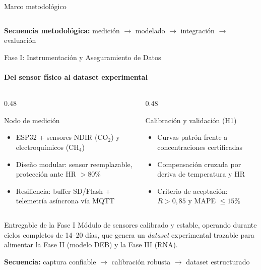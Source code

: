 \documentclass[aspectratio=169, 11pt]{beamer}
\begin{document}
\begin{frame}{Marco metodológico}
\begin{columns}[T,onlytextwidth]
\end{columns}

\vspace{0.25cm}
\centering
\footnotesize
\textbf{Secuencia metodológica:} medición $\rightarrow$ modelado $\rightarrow$ integración $\rightarrow$ evaluación
\end{frame}
\begin{frame}{Fase I: Instrumentación y Aseguramiento de Datos}
\framesubtitle{Del sensor físico al dataset experimental}

\begin{columns}[T,onlytextwidth]

\begin{column}{0.48\textwidth}

\begin{block}{Nodo de medición}
\scriptsize
\begin{itemize}
    \item ESP32 + sensores NDIR (CO$_2$) y electroquímicos (CH$_4$)
    \item Diseño modular: sensor reemplazable, protección ante HR $>80\%$
    \item Resiliencia: buffer SD/Flash + telemetría asíncrona vía MQTT
\end{itemize}
\end{block}

\end{column}

\begin{column}{0.48\textwidth}

\begin{block}{Calibración y validación (H1)}
\scriptsize
\begin{itemize}
    \item Curvas patrón frente a concentraciones certificadas
    \item Compensación cruzada por deriva de temperatura y HR
    \item Criterio de aceptación: $R > 0{,}85$ y MAPE $\leq 15\%$
\end{itemize}
\end{block}

\end{column}

\end{columns}

\vspace{0.20cm}

\begin{alertblock}{Entregable de la Fase I}
\scriptsize
Módulo de sensores calibrado y estable, operando durante ciclos completos de 14--20 días, que genera un \textit{dataset} experimental trazable para alimentar la Fase II (modelo DEB) y la Fase III (RNA).
\end{alertblock}

\vspace{0.15cm}
\centering
\scriptsize
\textbf{Secuencia:} captura confiable $\rightarrow$ calibración robusta $\rightarrow$ dataset estructurado
\end{frame}
\end{document}
